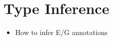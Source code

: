 \section{Type Inference}
\label{sec:type-inference}

\begin{itemize}
    \item How to infer E/G annotations
\end{itemize}